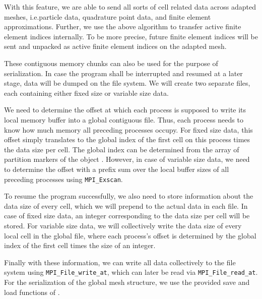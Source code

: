 

With this feature, we are able to send all sorts of cell related data across adapted meshes, i.e.\@ particle data, quadrature point data, and finite element approximations. Further, we use the above algorithm to transfer active finite element indices internally. To be more precise, future finite element indices will be sent and unpacked as active finite element indices on the adapted mesh.

These contiguous memory chunks can also be used for the purpose of serialization. In case the program shall be interrupted and resumed at a later stage, data will be dumped on the file system. We will create two separate files, each containing either fixed size or variable size data.

We need to determine the offset at which each process is supposed to write its local memory buffer into a global contiguous file. Thus, each process needs to know how much memory all preceding processes occupy. For fixed size data, this offset simply translates to the global index of the first cell on this process times the data size per cell. The global index can be determined from the array of partition markers of the \pforest{} object \parencite{burstedde2018}. However, in case of variable size data, we need to determine the offset with a prefix sum over the local buffer sizes of all preceding processes using \texttt{MPI\_Exscan}.


To resume the program successfully, we also need to store information about the data size of every cell, which we will prepend to the actual data in each file. In case of fixed size data, an integer corresponding to the data size per cell will be stored. For variable size data, we will collectively write the data size of every local cell in the global file, where each process's offset is determined by the global index of the first cell times the size of an integer.

Finally with these information, we can write all data collectively to the file system using \texttt{MPI\_File\_write\_at}, which can later be read via \texttt{MPI\_File\_read\_at}. For the serialization of the global mesh structure, we use the provided save and load functions of \pforest{}.


